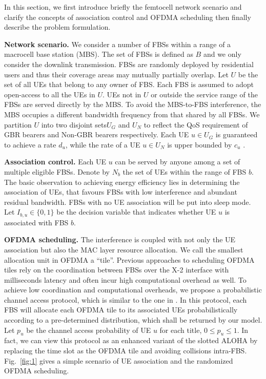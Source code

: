 \documentclass[conference]{IEEEtran}
\begin{document}
In this section, we first introduce briefly the femtocell network scenario and clarify the concepts of association control and OFDMA scheduling then finally describe the problem formulation.

\noindent\textbf{Network scenario.} We consider a number of FBSs within a range of a macrocell base station (MBS). The set of FBSs is defined as $B$ and we only consider the downlink transmission. FBSs are randomly deployed by residential users and thus their coverage areas may mutually partially overlap. Let $U$ be the set of all UEs that belong to any owner of FBS. Each FBS is assumed to adopt open-access to all the UEs in $U$. UEs not in $U$ or outside the service range of the FBSs are served directly by the MBS. To avoid the MBS-to-FBS interference, the MBS occupies a different bandwidth frequency from that shared by all FBSs. We partition $U$ into two disjoint sets\footnotemark $U_G$ and $U_N$ to reflect the QoS requirement of GBR bearers and Non-GBR bearers respectively. Each UE $u\in U_G$ is guaranteed to achieve a rate $d_u$, while the rate of a UE $u\in U_N$ is upper bounded by $c_u$ \cite{sesia2009lte}.


\noindent\textbf{Association control.} Each UE $u$ can be served by anyone among a set of multiple eligible FBSs. Denote by $N_b$ the set of UEs within the range of FBS $b$. The basic observation to achieving energy efficiency lies in determining the association of UEs, that favours FBSs with low interference and abundant residual bandwidth. FBSs with no UE association will be put into sleep mode. Let $I_{b,u}\in \{0, 1\}$ be the decision variable that indicates whether UE $u$ is associated with FBS $b$. 

\noindent\textbf{OFDMA scheduling.} The interference is coupled with not only the UE association but also the MAC layer resource allocation. We call the smallest allocation unit in OFDMA a ``tile''. Previous approaches \cite{hou2013energy} to scheduling OFDMA tiles rely on the coordination between FBSs over the X-2 interface with milliseconds latency and often incur high computational overhead as well. To achieve low coordination and computational overheads, we propose a probabilistic channel access protocol, which is similar to the one in \cite{hou2011proportionally}. In this protocol, each FBS will allocate each OFDMA tile to its associated UEs probabilistically according to a pre-determined distribution, which shall be returned by our model. Let $p_u$ be the channel access probability of UE $u$ for each title, $0\leq p_u\leq 1$. In fact, we can view this protocol as an enhanced variant of the slotted ALOHA by replacing the time slot as the OFDMA tile and avoiding collisions intra-FBS. Fig.~\ref{fig:1} gives a simple scenario of UE association and the randomized OFDMA scheduling.
\end{document}
